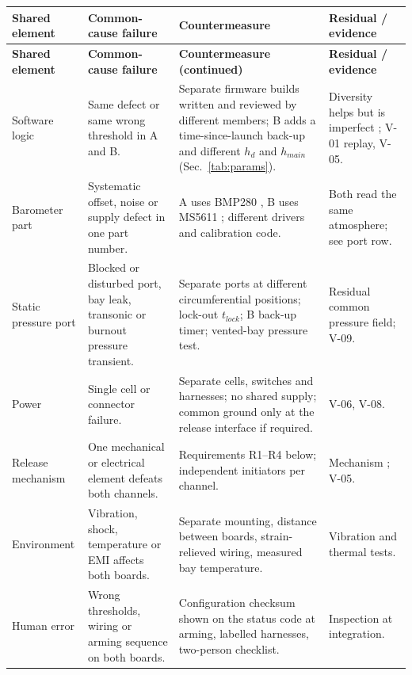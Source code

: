 \small
\begingroup
{}
\begin{longtable}{@{}L{25mm}L{38mm}L{52mm}L{35mm}@{}}
\toprule{}\textbf{Shared element}&\textbf{Common-cause failure}&\textbf{Countermeasure}&\textbf{Residual / evidence}\\\midrule\endfirsthead
\toprule{}\textbf{Shared element}&\textbf{Common-cause failure}&\textbf{Countermeasure (continued)}&\textbf{Residual / evidence}\\\midrule\endhead
\bottomrule\endlastfoot
Software logic & Same defect or same wrong threshold in A and B. & Separate firmware builds written and reviewed by different members; B adds a time-since-launch back-up and different $h_d$ and $h_{main}$ (Sec.~\ref{tab:params}). & Diversity helps but is imperfect \cite{knight1986}; V-01 replay, V-05.\\
Barometer part & Systematic offset, noise or supply defect in one part number. & A uses BMP280 \cite{bmp280ds}, B uses MS5611 \cite{ms5611ds}; different drivers and calibration code. & Both read the same atmosphere; see port row.\\
Static pressure port & Blocked or disturbed port, bay leak, transonic or burnout pressure transient. & Separate ports at different circumferential positions; lock-out $t_{lock}$; B back-up timer; vented-bay pressure test. & Residual common pressure field; V-09.\\
Power & Single cell or connector failure. & Separate cells, switches and harnesses; no shared supply; common ground only at the release interface if required. & V-06, V-08.\\
Release mechanism & One mechanical or electrical element defeats both channels. & Requirements R1--R4 below; independent initiators per channel. & Mechanism ; V-05.\\
Environment & Vibration, shock, temperature or EMI affects both boards. & Separate mounting, distance between boards, strain-relieved wiring, measured bay temperature. & Vibration and thermal tests.\\
Human error & Wrong thresholds, wiring or arming sequence on both boards. & Configuration checksum shown on the status code at arming, labelled harnesses, two-person checklist. & Inspection at integration.\\
\end{longtable}
\endgroup %
\normalsize

